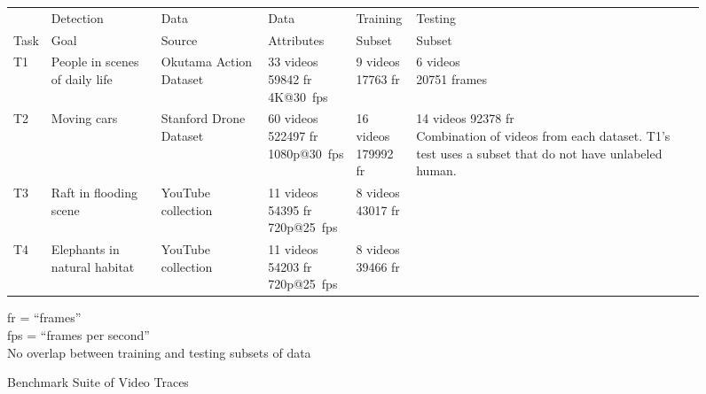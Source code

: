 \begin{figure}
\centering
\begin{tabular}{|p{1cm}|p{2cm}|p{2cm}|p{2.5cm}|p{2cm}|p{3cm}|}
\hline
   & Detection & Data & Data & Training & Testing \\ 
Task& Goal & Source & Attributes & Subset & Subset\\ 
\hline
T1 & {\small People in scenes of daily life}&{\small Okutama Action Dataset~\cite{Barekatain2017}}&\makecell[tl]{\small 33 videos \\\small 59842 fr\\\small 4K@30~fps}&\makecell[tl]{\small 9 videos\\\small 17763 fr}&\makecell[tl]{\small 6 videos\\\small 20751 frames}\\ 
\hline
T2 &{\small Moving cars}&{\small Stanford Drone Dataset~\cite{Robicquet2016}}&\makecell[tl]{\small 60 videos \\\small 522497 fr\\\small 1080p@30~fps}&\makecell[tl]{\small 16 videos\\\small 179992 fr} & \multirow{4}{*}{\parbox{3cm}{\centering\small 14 videos 92378 fr\\ Combination of videos from each dataset. T1's test uses a subset that do not have unlabeled human.}} \\ \cline{1-5}
T3 &{\small Raft in flooding scene}&{\small YouTube collection~\cite{YouTube1}}&\makecell[tl]{\small 11 videos \\\small 54395 fr\\\small 720p@25~fps}&\makecell[tl]{\small 8 videos\\\small 43017 fr} & \\ \cline{1-5}
T4 &{\small Elephants in natural habitat}&{\small YouTube collection~\cite{YouTube2}}&\makecell[tl]{\small 11 videos \\\small 54203 fr\\\small 720p@25~fps}&\makecell[tl]{\small 8 videos\\\small 39466 fr} & \\ \cline{1-5}
\hline
\end{tabular}
\vspace{0.2in}
\begin{captiontext}
fr = ``frames''\\
fps = ``frames per second''\\
No overlap between training and testing subsets of data
\end{captiontext}
\caption{Benchmark Suite of Video Traces}
\label{fig:benchmarksuite}
\end{figure}

